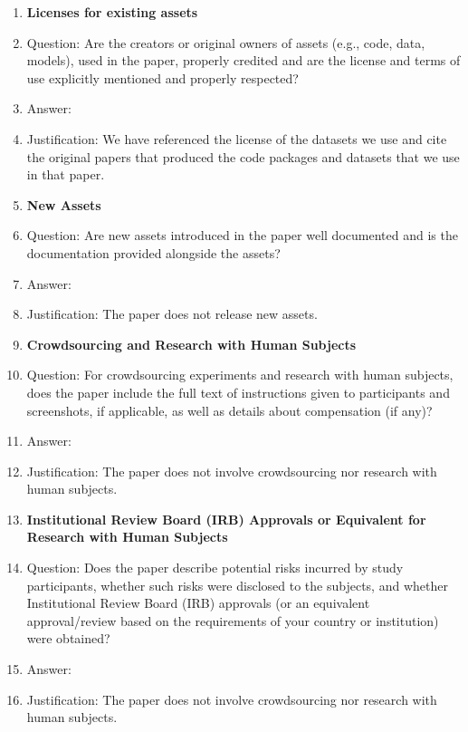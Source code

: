 \documentclass{article}
\begin{document}
\begin{enumerate}
\item {\bf Licenses for existing assets}
    \item[] Question: Are the creators or original owners of assets (e.g., code, data, models), used in the paper, properly credited and are the license and terms of use explicitly mentioned and properly respected?
    \item[] Answer: \answerYes{} %
    \item[] Justification: We have referenced the license of the datasets we use and cite the original papers that produced the code packages and datasets that we use in that paper. 


\item {\bf New Assets}
    \item[] Question: Are new assets introduced in the paper well documented and is the documentation provided alongside the assets?
    \item[] Answer: \answerNA{} %
    \item[] Justification: The paper does not release new assets.

\item {\bf Crowdsourcing and Research with Human Subjects}
    \item[] Question: For crowdsourcing experiments and research with human subjects, does the paper include the full text of instructions given to participants and screenshots, if applicable, as well as details about compensation (if any)? 
    \item[] Answer: \answerNA{} %
    \item[] Justification: The paper does not involve crowdsourcing nor research with human subjects.


\item {\bf Institutional Review Board (IRB) Approvals or Equivalent for Research with Human Subjects}
    \item[] Question: Does the paper describe potential risks incurred by study participants, whether such risks were disclosed to the subjects, and whether Institutional Review Board (IRB) approvals (or an equivalent approval/review based on the requirements of your country or institution) were obtained?
    \item[] Answer: \answerNA{} %
    \item[] Justification:  The paper does not involve crowdsourcing nor research with human subjects.


\end{enumerate}
\end{document}

